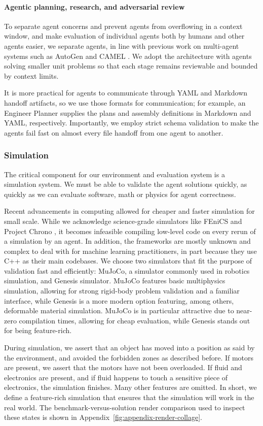 \documentclass[conference]{IEEEtran}
\begin{document}
\paragraph{Agentic planning, research, and adversarial review}
To separate agent concerns and prevent agents from overflowing in a context window, and make evaluation of individual agents both by humans and other agents easier, we separate agents, in line with previous work on multi-agent systems such as AutoGen \cite{ref24} and CAMEL \cite{ref25}. We adopt the architecture with agents solving smaller unit problems so that each stage remains reviewable and bounded by context limits.

It is more practical for agents to communicate through YAML and Markdown handoff artifacts, so we use those formats for communication; for example, an Engineer Planner supplies the plans and assembly definitions in Markdown and YAML, respectively. Importantly, we employ strict schema validation to make the agents fail fast on almost every file handoff from one agent to another.

\subsubsection{Simulation}
The critical component for our environment and evaluation system is a simulation system. We must be able to validate the agent solutions quickly, as quickly as we can evaluate software, math or physics for agent correctness.

Recent advancements in computing allowed for cheaper and faster simulation for small scale. While we acknowledge science-grade simulators like FEniCS \cite{ref7} and Project Chrono \cite{ref8}, it becomes infeasible compiling low-level code on every rerun of a simulation by an agent. In addition, the frameworks are mostly unknown and complex to deal with for machine learning practitioners, in part because they use C++ as their main codebases. We choose two simulators that fit the purpose of validation fast and efficiently: MuJoCo, a simulator commonly used in robotics simulation, and Genesis simulator. MuJoCo features basic multiphysics simulation, allowing for strong rigid-body problem validation and a familiar interface, while Genesis is a more modern option featuring, among others, deformable material simulation. MuJoCo is in particular attractive due to near-zero compilation times, allowing for cheap evaluation, while Genesis stands out for being feature-rich.

During simulation, we assert that an object has moved into a position as said by the environment, and avoided the forbidden zones as described before. If motors are present, we assert that the motors have not been overloaded. If fluid and electronics are present, and if fluid happens to touch a sensitive piece of electronics, the simulation finishes. Many other features are omitted. In short, we define a feature-rich simulation that ensures that the simulation will work in the real world. The benchmark-versus-solution render comparison used to inspect these states is shown in Appendix~\ref{fig:appendix-render-collage}.
\end{document}
